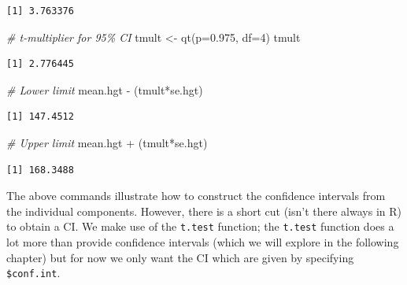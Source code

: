 \documentclass[
  oneside]{krantz}
\newenvironment{Shaded}{\begin{snugshade}}{\end{snugshade}}
\newcommand{\AttributeTok}[1]{\textcolor[rgb]{0.77,0.63,0.00}{#1}}
\newcommand{\CommentTok}[1]{\textcolor[rgb]{0.56,0.35,0.01}{\textit{#1}}}
\newcommand{\DecValTok}[1]{\textcolor[rgb]{0.00,0.00,0.81}{#1}}
\newcommand{\FloatTok}[1]{\textcolor[rgb]{0.00,0.00,0.81}{#1}}
\newcommand{\FunctionTok}[1]{\textcolor[rgb]{0.00,0.00,0.00}{#1}}
\newcommand{\NormalTok}[1]{#1}
\newcommand{\OtherTok}[1]{\textcolor[rgb]{0.56,0.35,0.01}{#1}}
\newcommand{\SpecialCharTok}[1]{\textcolor[rgb]{0.00,0.00,0.00}{#1}}
\begin{document}
\begin{verbatim}
[1] 3.763376
\end{verbatim}

\begin{Shaded}
\begin{Highlighting}[]
\CommentTok{\# t{-}multiplier for 95\% CI}
\NormalTok{tmult }\OtherTok{\textless{}{-}} \FunctionTok{qt}\NormalTok{(}\AttributeTok{p=}\FloatTok{0.975}\NormalTok{, }\AttributeTok{df=}\DecValTok{4}\NormalTok{)}
\NormalTok{tmult}
\end{Highlighting}
\end{Shaded}

\begin{verbatim}
[1] 2.776445
\end{verbatim}

\begin{Shaded}
\begin{Highlighting}[]
\CommentTok{\# Lower limit}
\NormalTok{mean.hgt }\SpecialCharTok{{-}}\NormalTok{ (tmult}\SpecialCharTok{*}\NormalTok{se.hgt)}
\end{Highlighting}
\end{Shaded}

\begin{verbatim}
[1] 147.4512
\end{verbatim}

\begin{Shaded}
\begin{Highlighting}[]
\CommentTok{\# Upper limit}
\NormalTok{mean.hgt }\SpecialCharTok{+}\NormalTok{ (tmult}\SpecialCharTok{*}\NormalTok{se.hgt)}
\end{Highlighting}
\end{Shaded}

\begin{verbatim}
[1] 168.3488
\end{verbatim}

The above commands illustrate how to construct the confidence intervals from the individual components. However, there is a short cut (isn't there always in R) to obtain a CI. We make use of the \texttt{t.test} function; the \texttt{t.test} function does a lot more than provide confidence intervals (which we will explore in the following chapter) but for now we only want the CI which are given by specifying \texttt{\$conf.int}.

\begin{Shaded}
\end{Shaded}
\end{document}
